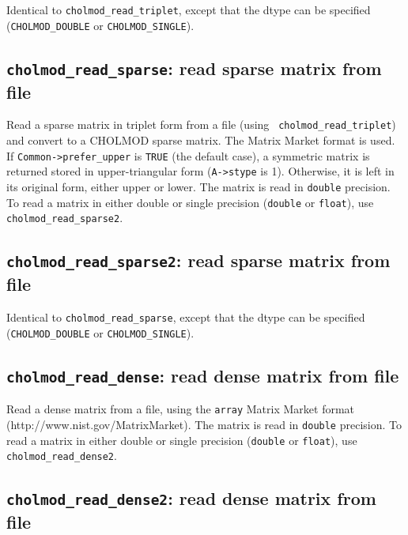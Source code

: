 \documentclass[11pt]{article}
\begin{document}

Identical to \verb'cholmod_read_triplet', except that the dtype can be
specified (\verb'CHOLMOD_DOUBLE' or \verb'CHOLMOD_SINGLE').

\subsection{{\tt cholmod\_read\_sparse}: read sparse matrix from file}


Read a sparse matrix in triplet form from a file (using {\tt
cholmod\_read\_triplet}) and convert to a CHOLMOD sparse matrix.  The Matrix
Market format is used.  If {\tt Common->prefer\_upper} is {\tt TRUE} (the
default case), a symmetric matrix is returned stored in upper-triangular form
({\tt A->stype} is 1).  Otherwise, it is left in its original form, either
upper or lower.
%
The matrix is read in {\tt double} precision.  To read a matrix
in either double or single precision ({\tt double} or {\tt float}),
use \verb'cholmod_read_sparse2'.

\subsection{{\tt cholmod\_read\_sparse2}: read sparse matrix from file}


Identical to \verb'cholmod_read_sparse', except that the dtype can be
specified (\verb'CHOLMOD_DOUBLE' or \verb'CHOLMOD_SINGLE').

\subsection{{\tt cholmod\_read\_dense}: read dense matrix from file}


Read a dense matrix from a file, using the {\tt array} Matrix Market format
\newline (http://www.nist.gov/MatrixMarket).
%
The matrix is read in {\tt double} precision.  To read a matrix
in either double or single precision ({\tt double} or {\tt float}),
use \verb'cholmod_read_dense2'.

\subsection{{\tt cholmod\_read\_dense2}: read dense matrix from file}
\end{document}
